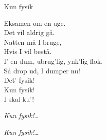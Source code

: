 \begin{song}{Kun fysik}
  \begin{SBVerse}
    Eksamen om en uge.\\
    Det vil aldrig gå.\\
    Natten må I bruge,\\
    Hvis I vil bestå.\\
    I' en dum, ubrug'lig, ynk'lig flok.\\
    Så drop ud, I dumper nu!\\
    Det' fysik!\\
    Kun fysik!\\
    I skal ku'!
  \end{SBVerse}

  \begin{SBChorus}
    \emph{Kun fysik!}\ldots
  \end{SBChorus}

  \begin{SBChorus}
    \emph{Kun fysik!}\ldots
  \end{SBChorus}
\end{song}